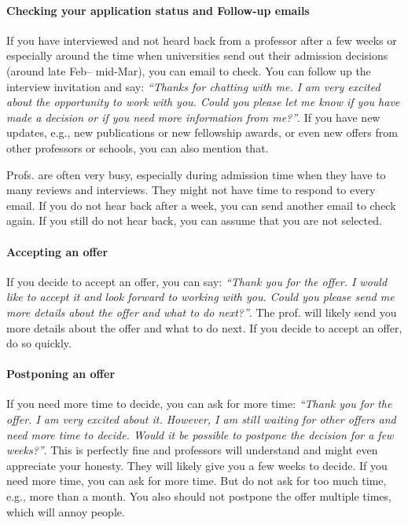 \documentclass[oneside,11pt,dvipsnames]{book}
\begin{document}
\paragraph{Checking your application status and Follow-up emails} If you have interviewed and not heard back from a professor after a few weeks or especially around the time when universities send out their admission decisions (around late Feb-- mid-Mar), you can email to check.  You can follow up the interview invitation and say: \emph{``Thanks for chatting with me. I am very excited about the opportunity to work with you.  Could you please let me know if you have made a decision or if you need more information from me?''}.  If you have new updates, e.g., new publications or new fellowship awards, or even new offers from other professors or schools, you can also mention that.

Profs. are often very busy, especially during admission time when they have to many reviews and interviews.  They might not have time to respond to every email.  If you do not hear back after a week, you can send another email to check again.  If you still do not hear back, you can assume that you are not selected.

\paragraph{Accepting an offer} If you decide to accept an offer, you can say: \emph{``Thank you for the offer.  I would like to accept it and look forward to working with you.  Could you please send me more details about the offer and what to do next?''}. The prof. will likely send you more details about the offer and what to do next.  If you decide to accept an offer, do so quickly.



\paragraph{Postponing an offer} If you need more time to decide, you can ask for more time: \emph{``Thank you for the offer.  I am very excited about it.  However, I am still waiting for other offers and need more time to decide.  Would it be possible to postpone the decision for a few weeks?''}.  This is perfectly fine and professors will understand and might even appreciate your honesty.  They will likely give you a few weeks to decide.  If you need more time, you can ask for more time.  But do not ask for too much time, e.g., more than a month.  You also should not postpone the offer multiple times, which will annoy people.
\end{document}
